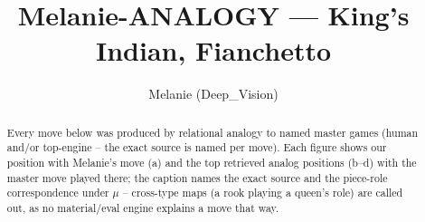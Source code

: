\documentclass[11pt]{article}
\title{Melanie-ANALOGY — King's Indian, Fianchetto}
\author{Melanie (Deep\_Vision)}
\date{}
\begin{document}
\maketitle

\begin{abstract}Every move below was produced by relational analogy to named master games (human and/or top-engine -- the exact source is named per move). Each figure shows our position with Melanie's move (a) and the top retrieved analog positions (b--d) with the master move played there; the caption names the exact source and the piece-role correspondence under $\mu$ -- cross-type maps (a rook playing a queen's role) are called out, as no material/eval engine explains a move that way.\end{abstract}

\begin{figure}[p]\centering
\begin{subfigure}{0.46\textwidth}\centering
\resizebox{\linewidth}{!}{%
\newchessgame
\chessboard[
  setfen={r1bq1rk1/pppnppbp/3p1np1/8/2PP3P/2N2NP1/PP2PPB1/R1BQK2R b KQ - 0 7},
  showmover=false,
  pgfstyle=straightmove, color=movearrow, markmove={d8-e8}
]}
\caption{}
\end{subfigure}\hfill
\begin{subfigure}{0.46\textwidth}\centering
\resizebox{\linewidth}{!}{%
\newchessgame
\chessboard[
  setfen={rn1qk2r/pbp1bppp/4pn2/3p4/Pp6/3P1NP1/1PPNPPBP/R1BQ1RK1 w kq - 0 8},
  showmover=false,
  pgfstyle=straightmove, color=movearrow, markmove={c2-c4}
]}
\caption{}
\end{subfigure}
\\[4pt]
\begin{subfigure}{0.46\textwidth}\centering
\resizebox{\linewidth}{!}{%
\newchessgame
\chessboard[
  setfen={r1bq1rk1/pppnppbp/3p1np1/8/2PP4/2N2NP1/PP2PPBP/R1BQ1RK1 b - - 3 7},
  showmover=false,
  pgfstyle=straightmove, color=movearrow, markmove={c7-c6}
]}
\caption{}
\end{subfigure}\hfill
\begin{subfigure}{0.46\textwidth}\centering
\resizebox{\linewidth}{!}{%
\newchessgame
\chessboard[
  setfen={r1bq1rk1/pppnppbp/3p1np1/8/2PP4/2N2NP1/PP2PPBP/R1BQ1RK1 b - - 3 7},
  showmover=false,
  pgfstyle=straightmove, color=movearrow, markmove={c7-c6}
]}
\caption{}
\end{subfigure}

\end{figure}
\end{document}
